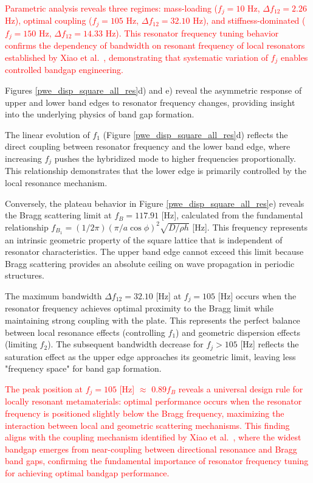 \documentclass[review,numbers,sort&compress]{elsarticle}
\begin{document}
\textcolor{red}{Parametric analysis reveals three regimes: mass-loading ($f_j = 10$ Hz, $\Delta f_{12} = 2.26$ Hz), optimal coupling ($f_j = 105$ Hz, $\Delta f_{12} = 32.10$ Hz), and stiffness-dominated ($f_j = 150$ Hz, $\Delta f_{12} = 14.33$ Hz). This resonator frequency tuning behavior confirms the dependency of bandwidth on resonant frequency of local resonators established by Xiao et al.~\cite{Xiao_2012}, demonstrating that systematic variation of $f_j$ enables controlled bandgap engineering.}

Figures \ref{pwe_disp_square_all_res}d) and e) reveal the asymmetric response of upper and lower band edges to resonator frequency changes, providing insight into the underlying physics of band gap formation. 

The linear evolution of $f_1$ (Figure \ref{pwe_disp_square_all_res}d) reflects the direct coupling between resonator frequency and the lower band edge, where increasing $f_j$ pushes the hybridized mode to higher frequencies proportionally. This relationship demonstrates that the lower edge is primarily controlled by the local resonance mechanism.

Conversely, the plateau behavior in Figure \ref{pwe_disp_square_all_res}e) reveals the Bragg scattering limit at $f_B = 117.91$ [Hz], calculated from the fundamental relationship $f_{B_1} = (1/2\pi)(\pi/a\cos\phi)^2 \sqrt{D/\rho h}$ [Hz]. This frequency represents an intrinsic geometric property of the square lattice that is independent of resonator characteristics. The upper band edge cannot exceed this limit because Bragg scattering provides an absolute ceiling on wave propagation in periodic structures.

The maximum bandwidth $\Delta f_{12} = 32.10$ [Hz] at $f_j = 105$ [Hz] occurs when the resonator frequency achieves optimal proximity to the Bragg limit while maintaining strong coupling with the plate. This represents the perfect balance between local resonance effects (controlling $f_1$) and geometric dispersion effects (limiting $f_2$). The subsequent bandwidth decrease for $f_j > 105$ [Hz] reflects the saturation effect as the upper edge approaches its geometric limit, leaving less "frequency space" for band gap formation.

\textcolor{red}{The peak position at $f_j = 105$ [Hz] $\approx$ $0.89 f_B$ reveals a universal design rule for locally resonant metamaterials: optimal performance occurs when the resonator frequency is positioned slightly below the Bragg frequency, maximizing the interaction between local and geometric scattering mechanisms. This finding aligns with the coupling mechanism identified by Xiao et al.~\cite{Xiao_2012}, where the widest bandgap emerges from near-coupling between directional resonance and Bragg band gaps, confirming the fundamental importance of resonator frequency tuning for achieving optimal bandgap performance.} 
\end{document}
